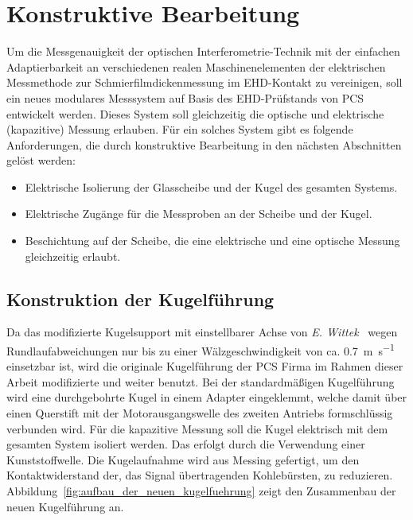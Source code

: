 \chapter{Konstruktive Bearbeitung}
\label{chap:konstruktive_bearbeitung}

Um die Messgenauigkeit der optischen Interferometrie-Technik mit der einfachen Adaptierbarkeit an verschiedenen realen Maschinenelementen der elektrischen Messmethode zur Schmierfilmdickenmessung im EHD-Kontakt zu vereinigen, soll ein neues modulares Messsystem auf Basis des EHD-Prüfstands von PCS entwickelt werden.
Dieses System soll gleichzeitig die optische und elektrische (kapazitive) Messung erlauben.
Für ein solches System gibt es folgende Anforderungen, die durch konstruktive Bearbeitung in den nächsten Abschnitten gelöst werden:

\begin{itemize}
    \item Elektrische Isolierung der Glasscheibe und der Kugel des gesamten Systems.
    \item Elektrische Zugänge für die Messproben an der Scheibe und der Kugel.
    \item Beschichtung auf der Scheibe, die eine elektrische und eine optische Messung gleichzeitig erlaubt.
\end{itemize}

\section{Konstruktion der Kugelführung}
\label{sec:konstruktion_der_kugelfuehrung}

Da das modifizierte Kugelsupport mit einstellbarer Achse von \textit{E. Wittek}~\cite{wittek_2007} wegen Rundlaufabweichungen nur bis zu einer Wälzgeschwindigkeit von ca. \SI[per-mode=symbol]{0.7}{\meter\per\second} einsetzbar ist, wird die originale Kugelführung der PCS Firma im Rahmen dieser Arbeit modifizierte und weiter benutzt.
Bei der standardmäßigen Kugelführung wird eine durchgebohrte Kugel in einem Adapter eingeklemmt, welche damit über einen Querstift mit der Motorausgangswelle des zweiten Antriebs formschlüssig verbunden wird.
Für die kapazitive Messung soll die Kugel elektrisch mit dem gesamten System isoliert werden.
Das erfolgt durch die Verwendung einer Kunststoffwelle.
Die Kugelaufnahme wird aus Messing gefertigt, um den Kontaktwiderstand der, das Signal übertragenden Kohlebürsten, zu reduzieren.
Abbildung~\ref{fig:aufbau_der_neuen_kugelfuehrung} zeigt den Zusammenbau der neuen Kugelführung an.


